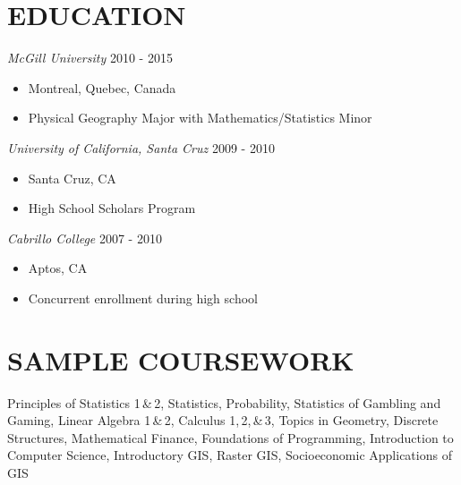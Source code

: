 \documentclass[margin]{res}
\begin{document}
\begin{resume}
 \vspace{-13pt}
\section{EDUCATION} %
\textit{McGill University} \hfill 2010 - 2015
\begin{itemize}
\item[] Montreal, Quebec, Canada  %
\hspace{-7pt}
\vspace{-5pt}\item[] Physical Geography Major with Mathematics/Statistics Minor
\end{itemize}


\vspace{-7pt}
\textit{University of California, Santa Cruz} \hfill 2009 - 2010
\begin{itemize}
\item[] Santa Cruz, CA
\vspace{-5pt}\item[] High School Scholars Program
 \end{itemize}

\vspace{-7pt}
\textit{Cabrillo College} \hfill 2007 - 2010
\begin{itemize}
\item[] Aptos, CA
\vspace{-5pt}\item[] Concurrent enrollment during high school
 \end{itemize}

\section{SAMPLE COURSEWORK} 
\textbullet\hspace{3pt} Principles of Statistics 1\,\&\,2, Statistics, Probability, Statistics of Gambling and Gaming, Linear Algebra 1\,\&\,2, Calculus 1,\,2,\,\&\,3, Topics in Geometry, Discrete Structures, Mathematical Finance,  Foundations of Programming, Introduction to Computer Science, Introductory GIS, Raster GIS, Socioeconomic Applications of GIS%



\end{resume}
\end{document}
